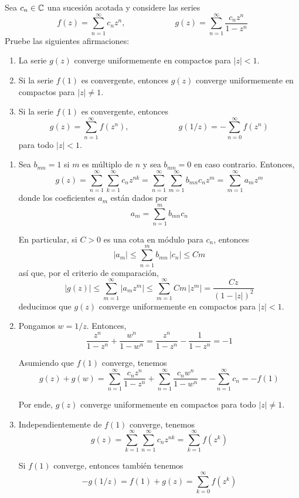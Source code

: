 \begin{exercise}
Sea $c_n \in \mathbb C$ una sucesión acotada y considere las series
$$f(z) = \sum_{n=1}^\infty c_n z^n, \qquad \qquad \qquad g(z) = \sum_{n=1}^\infty \frac {c_n z^n} {1 - z^n}$$
Pruebe las siguientes afirmaciones:
\begin{enumerate}[label=(\alph*)]
    \item La serie $g(z)$ converge uniformemente en compactos para $|z| < 1$.
    
    \item Si la serie $f(1)$ es convergente, entonces $g(z)$ converge uniformemente en compactos para $|z| \ne 1$.
    
    \item Si la serie $f(1)$ es convergente, entonces
    $$g(z) = \sum_{n=1}^\infty f(z^n), \qquad \qquad \qquad g(1/z) = -\sum_{n=0}^\infty f(z^n)$$
    para todo $|z| < 1$.
\end{enumerate}
\end{exercise}

\begin{solution}
\leavevmode
\begin{enumerate}[label=(\alph*)]
    \item Sea $b_{mn} = 1$ si $m$ es múltiplo de $n$ y sea $b_{mn} = 0$ en caso contrario. Entonces,
    $$
    g(z)
        = \sum_{n=1}^\infty \sum_{k=1}^\infty c_n z^{nk}
        = \sum_{n=1}^\infty \sum_{m=1}^\infty b_{mn} c_n z^m
        = \sum_{m=1}^\infty a_m z^m
    $$
    donde los coeficientes $a_m$ están dados por
    $$a_m = \sum_{n=1}^m b_{mn} c_n$$
    
    En particular, si $C > 0$ es una cota en módulo para $c_n$, entonces
    $$|a_m| \le \sum_{n=1}^m b_{mn} \, |c_n| \le Cm$$
    así que, por el criterio de comparación,
    $$|g(z)| \le \sum_{m=1}^\infty |a_m z^m| \le \sum_{m=1}^\infty Cm \, |z^m| = \frac {Cz} {(1 - |z|)^2}$$
    deducimos que $g(z)$ converge uniformemente en compactos para $|z| < 1$.
    
    \item Pongamos $w = 1/z$. Entonces,
    $$\frac {z^n} {1 - z^n} + \frac {w^n} {1 - w^n} = \frac {z^n} {1 - z^n} - \frac 1 {1 - z^n} = -1$$
    
    Asumiendo que $f(1)$ converge, tenemos
    $$
    g(z) + g(w)
        = \sum_{n=1}^\infty \frac {c_n z^n} {1 - z^n}
        + \sum_{n=1}^\infty \frac {c_n w^n} {1 - w^n}
        = -\sum_{n=1}^\infty c_n
        = -f(1)
    $$
    
    Por ende, $g(z)$ converge uniformemente en compactos para todo $|z| \ne 1$.
    
    \item Independientemente de $f(1)$ converge, tenemos
    $$g(z) = \sum_{k=1}^\infty \sum_{n=1}^\infty c_n z^{nk} = \sum_{k=1}^\infty f(z^k)$$
    
    Si $f(1)$ converge, entonces también tenemos
    $$-g(1/z) = f(1) + g(z) = \sum_{k=0}^\infty f(z^k)$$
\end{enumerate}
\end{solution}
